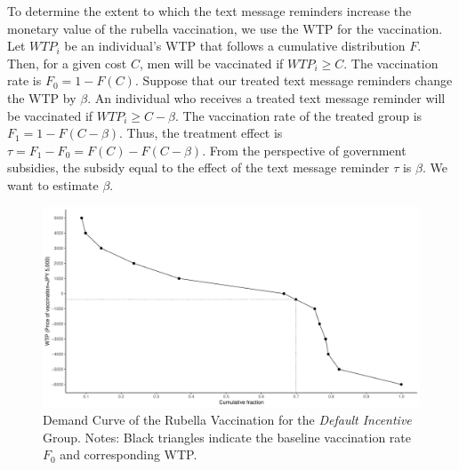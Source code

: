 \documentclass[
    a4paper
]{article}
\begin{document}
To determine the extent to which the text message reminders increase the monetary value of the rubella vaccination, we use the WTP for the vaccination. Let \(WTP_i\) be an individual's WTP that follows a cumulative distribution \(F\). Then, for a given cost \(C\), men will be vaccinated if \(WTP_i \ge C\). The vaccination rate is \(F_0 = 1-F(C)\). Suppose that our treated text message reminders change the WTP by \(\beta\). An individual who receives a treated text message reminder will be vaccinated if \(WTP_i\ge C-\beta\). The vaccination rate of the treated group is \(F_1 = 1-F(C-\beta)\). Thus, the treatment effect is \(\tau = F_1-F_0=F(C)-F(C-\beta)\). From the perspective of government subsidies, the subsidy equal to the effect of the text message reminder \(\tau\) is \(\beta\). We want to estimate \(\beta\).

\begin{figure}[t]
\includegraphics{Supplementary-Material_files/figure-latex/demand-function-1} \caption{Demand Curve of the Rubella Vaccination for the \emph{Default Incentive} Group. Notes: Black triangles indicate the baseline vaccination rate $F_0$ and corresponding WTP.}\label{fig:demand-function}
\end{figure}
\end{document}
